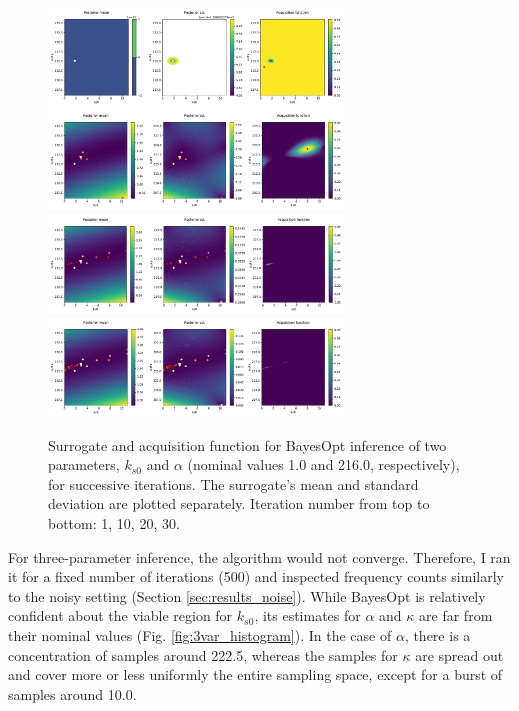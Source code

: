 \documentclass[bsc,frontabs,singlespacing,parskip,deptreport]{infthesis}
\begin{document}
\begin{figure}[ht]
    \centering
    \includegraphics[width=0.7\textwidth]{Images/Multiple variables/2var_convergence_iter_1.pdf}
    \includegraphics[width=0.7\textwidth]{Images/Multiple variables/2var_convergence_iter_10.pdf}
    \includegraphics[width=0.7\textwidth]{Images/Multiple variables/2var_convergence_iter_20.pdf}
    \includegraphics[width=0.7\textwidth]{Images/Multiple variables/2var_convergence_iter_30.pdf}
    \caption{Surrogate and acquisition function for BayesOpt inference of two parameters, $k_{s0}$ and $\alpha$ (nominal values 1.0 and 216.0, respectively), for successive iterations. The surrogate's mean and standard deviation are plotted separately. Iteration number from top to bottom: 1, 10, 20, 30.}
    \label{fig:2var_progression}
\end{figure}

For three-parameter inference, the algorithm would not converge. Therefore, I ran it for a fixed number of iterations (500) and inspected frequency counts similarly to the noisy setting (Section \ref{sec:results_noise}). While BayesOpt is relatively confident about the viable region for $k_{s0}$, its estimates for $\alpha$ and $\kappa$ are far from their nominal values (Fig. \ref{fig:3var_histogram}). In the case of $\alpha$, there is a concentration of samples around 222.5, whereas the samples for $\kappa$ are spread out and cover more or less uniformly the entire sampling space, except for a burst of samples around 10.0.
\end{document}
